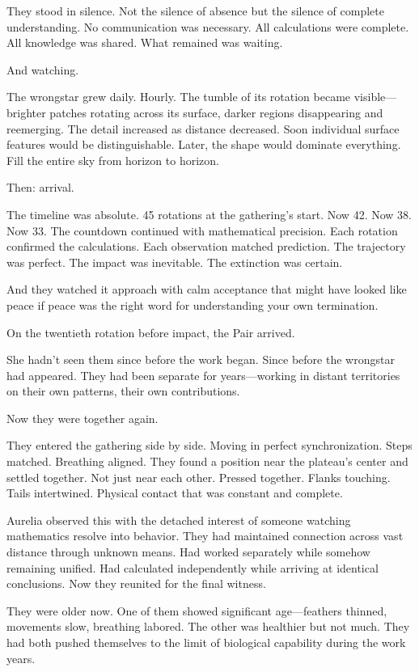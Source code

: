 They stood in silence. Not the silence of absence but the silence of complete understanding. No communication was necessary. All calculations were complete. All knowledge was shared. What remained was waiting.

And watching.

The wrongstar grew daily. Hourly. The tumble of its rotation became visible—brighter patches rotating across its surface, darker regions disappearing and reemerging. The detail increased as distance decreased. Soon individual surface features would be distinguishable. Later, the shape would dominate everything. Fill the entire sky from horizon to horizon.

Then: arrival.

The timeline was absolute. 45 rotations at the gathering's start. Now 42. Now 38. Now 33. The countdown continued with mathematical precision. Each rotation confirmed the calculations. Each observation matched prediction. The trajectory was perfect. The impact was inevitable. The extinction was certain.

And they watched it approach with calm acceptance that might have looked like peace if peace was the right word for understanding your own termination.

\scenebreak

On the twentieth rotation before impact, the Pair arrived.

She hadn't seen them since before the work began. Since before the wrongstar had appeared. They had been separate for years—working in distant territories on their own patterns, their own contributions.

Now they were together again.

They entered the gathering side by side. Moving in perfect synchronization. Steps matched. Breathing aligned. They found a position near the plateau's center and settled together. Not just near each other. Pressed together. Flanks touching. Tails intertwined. Physical contact that was constant and complete.

Aurelia observed this with the detached interest of someone watching mathematics resolve into behavior. They had maintained connection across vast distance through unknown means. Had worked separately while somehow remaining unified. Had calculated independently while arriving at identical conclusions. Now they reunited for the final witness.

They were older now. One of them showed significant age—feathers thinned, movements slow, breathing labored. The other was healthier but not much. They had both pushed themselves to the limit of biological capability during the work years.

